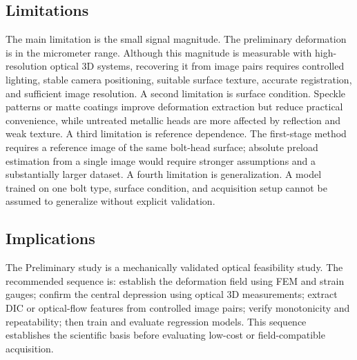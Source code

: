 \subsection{Limitations}
The main limitation is the small signal magnitude. The preliminary deformation is in the micrometer range. Although this magnitude is measurable with high-resolution optical 3D systems, recovering it from image pairs requires controlled lighting, stable camera positioning, suitable surface texture, accurate registration, and sufficient image resolution. A second limitation is surface condition. Speckle patterns or matte coatings improve deformation extraction but reduce practical convenience, while untreated metallic heads are more affected by reflection and weak texture. A third limitation is reference dependence. The first-stage method requires a reference image of the same bolt-head surface; absolute preload estimation from a single image would require stronger assumptions and a substantially larger dataset. A fourth limitation is generalization. A model trained on one bolt type, surface condition, and acquisition setup cannot be assumed to generalize without explicit validation.

\subsection{Implications}

The Preliminary study is a mechanically validated optical feasibility study. The recommended sequence is: establish the deformation field using FEM and strain gauges; confirm the central depression using optical 3D measurements; extract DIC or optical-flow features from controlled image pairs; verify monotonicity and repeatability; then train and evaluate regression models. This sequence establishes the scientific basis before evaluating low-cost or field-compatible acquisition.